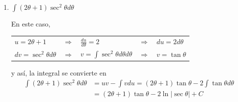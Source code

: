 \begin{enumerate}[leftmargin=1.2em,   itemindent=0pt,       labelwidth=\labelwidth,labelsep=0.5em,]
pero la última integral no es inmediata y tiene la forma deseada en integración por partes. Usaremos nuevamente el método con la integral {\small $\displaystyle{\int 4x\cos \left(\frac{1}{2}x\right)dx}$:}


\begin{center}
\begin{tabular}{lllll}
$u=4x$ & $\Rightarrow$ & $\frac{du}{dx} =4$ & $\Rightarrow$ & $du=4dx$\\
$dv=\cos \left(\frac{1}{2}x\right)dx$ & $\Rightarrow$ & $v =\int \cos \left(\frac{1}{2}x\right)dx$ & $\Rightarrow$ & $v=2\sen\left(\frac{1}{2}x\right)$
\end{tabular}
\end{center}


y así,
{\small
\begin{align*}
\displaystyle{\int 4x\cos \left(\frac{1}{2}x\right)dx}&=uv-\int vdu=8\sen\left(\frac{1}{2}x\right)-8\int \sen\left(\frac{1}{2}x\right)dx\\
&=8\sen\left(\frac{1}{2}x\right)+16 \cos\left(\frac{1}{2}x\right)+C
\end{align*}
}

y agrupando toda la información, se tiene
{\small
\begin{align*}
\int x^{2}\sen \left(\frac{1}{2}x\right)dx&=-2x^{2}\cos \left(\frac{1}{2}x\right)+\int 4x\cos \left(\frac{1}{2}x\right)dx,\\
&=-2x^{2}\cos \left(\frac{1}{2}x\right)+8\sen \left(\frac{1}{2}x\right)+16\cos \left(\frac{1}{2}x\right)+C
\end{align*}
}

\item $\displaystyle{\int (2\theta +1)\sec^{2}\theta d\theta}$

En este caso,

\begin{center}
\begin{tabular}{lllll}
$u=2\theta +1$ & $\Rightarrow$ & $\frac{du}{d\theta} =2$ & $\Rightarrow$ & $du=2d\theta$\\
$dv=\sec ^{2}\theta d\theta$ & $\Rightarrow$ & $v =\int \sec ^{2}\theta d\theta d\theta$ & $\Rightarrow$ & $v=\tan \theta$
\end{tabular}
\end{center}
y así, la integral se convierte en
\begin{align*}
\int (2\theta +1)\sec ^{2}\theta d\theta&=uv-\int vdu=(2\theta +1)\tan \theta -2\int \tan \theta d\theta\\
&=(2\theta +1)\tan \theta -2\ln |\sec \theta |+C 
\end{align*}


\end{enumerate}

